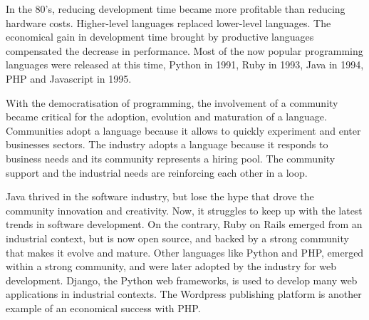 In the 80's, reducing development time became more profitable than reducing hardware costs.
Higher-level languages replaced lower-level languages.
The economical gain in development time brought by productive languages compensated the decrease in performance.
Most of the now popular programming languages were released at this time, Python in 1991, Ruby in 1993, Java in 1994, PHP and Javascript in 1995.

With the democratisation of programming, the involvement of a community became critical for the adoption, evolution and maturation of a language.
Communities adopt a language because it allows to quickly experiment and enter businesses sectors.
The industry adopts a language because it responds to business needs and its community represents a hiring pool.
The community support and the industrial needs are reinforcing each other in a loop.

Java thrived in the software industry, but lose the hype that drove the community innovation and creativity.
Now, it struggles to keep up with the latest trends in software development.
On the contrary, Ruby on Rails emerged from an industrial context, but is now open source, and backed by a strong community that makes it evolve and mature.
Other languages like Python and PHP, emerged within a strong community, and were later adopted by the industry for web development.
Django, the Python web frameworks, is used to develop many web applications in industrial contexts.
The Wordpress publishing platform is another example of an economical success with PHP.


